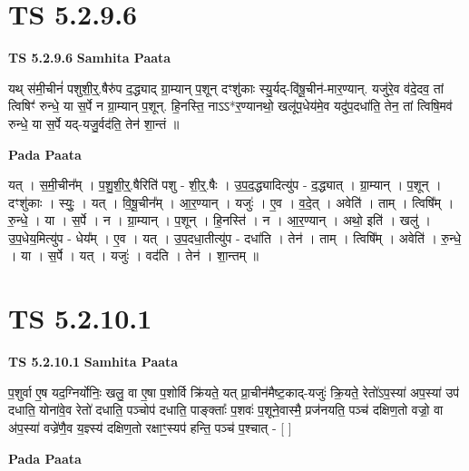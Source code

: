 \documentclass[17pt]{extarticle}
\begin{document}
\section*{ TS 5.2.9.6 }

\textbf{TS 5.2.9.6 } \newline
\textbf{Samhita Paata} \newline

यथ् स॑मी॒चीनं॑ पशुशी॒र्॒.षैरु॑प द॒द्ध्याद् ग्रा॒म्यान् प॒शून् दꣳशु॑काः स्यु॒र्यद्-वि॑षू॒चीन॑-मार॒ण्यान्. यजु॑रे॒व व॑दे॒दव॒ तां त्विषिꣳ॑ रुन्धे॒ या स॒र्पे न ग्रा॒म्यान् प॒शून्. हि॒नस्ति॒ नाऽऽ*र॒ण्यानथो॒ खलू॑प॒धेय॑मे॒व यदु॑प॒दधा॑ति॒ तेन॒ तां त्विषि॒मव॑ रुन्धे॒ या स॒र्पे यद्-यजु॒र्वद॑ति॒ तेन॑ शा॒न्तं ॥ \newline

\textbf{Pada Paata} \newline

यत् । स॒मी॒चीन᳚म् । प॒शु॒शी॒र्॒.षैरिति॑ पशु - शी॒र्॒.षैः । उ॒प॒द॒द्ध्यादित्यु॑प - द॒द्ध्यात् । ग्रा॒म्यान् । प॒शून् । दꣳशु॑काः । स्युः॒ । यत् । वि॒षू॒चीन᳚म् । आ॒र॒ण्यान् । यजुः॑ । ए॒व । व॒दे॒त् । अवेति॑ । ताम् । त्विषि᳚म् । रु॒न्धे॒ । या । स॒र्पे । न । ग्रा॒म्यान् । प॒शून् । हि॒नस्ति॑ । न । आ॒र॒ण्यान् । अथो॒ इति॑ । खलु॑ । उ॒प॒धेय॒मित्यु॑प - धेय᳚म् । ए॒व । यत् । उ॒प॒दधा॒तीत्यु॑प - दधा॑ति । तेन॑ । ताम् । त्विषि᳚म् । अवेति॑ । रु॒न्धे॒ । या । स॒र्पे । यत् । यजुः॑ । वद॑ति । तेन॑ । शा॒न्तम् ॥  \newline




\section*{ TS 5.2.10.1 }

\textbf{TS 5.2.10.1 } \newline
\textbf{Samhita Paata} \newline

प॒शुर्वा ए॒ष यद॒ग्निर्योनिः॒ खलु॒ वा ए॒षा प॒शोर्वि क्रि॑यते॒ यत् प्रा॒चीन॑मैष्ट॒काद्-यजुः॑ क्रि॒यते॒ रेतो॑ऽप॒स्या॑ अप॒स्या॑ उप॑ दधाति॒ योना॑वे॒व रेतो॑ दधाति॒ पञ्चोप॑ दधाति॒ पाङ्क्ताः᳚ प॒शवः॑ प॒शूने॒वास्मै॒ प्रज॑नयति॒ पञ्च॑ दक्षिण॒तो वज्रो॒ वा अ॑प॒स्या॑ वज्रे॑णै॒व य॒ज्ञ्स्य॑ दक्षिण॒तो रक्षाꣳ॒॒स्यप॑ हन्ति॒ पञ्च॑ प॒श्चात् - [  ] \newline

\textbf{Pada Paata} \newline
\end{document}
